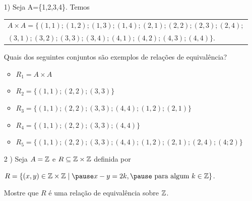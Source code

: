 \documentclass{beamer}
\begin{document}
    \begin{frame}
        \begin{exemplos}
            \begin{itemize}
                \item[1)] Seja A=\{1,2,3,4\}. \pause Temos
                \begin{center}
                    \begin{tabular}{l}
                        $A\times A = \{(1,1); (1,2);(1,3);(1,4);(2,1);(2,2);(2,3);(2,4);$\\
                        $(3,1);(3,2);(3,3);(3,4);(4,1);(4,2);(4,3);(4,4)\}.$
                    \end{tabular}
                \end{center}
                Quais dos seguintes conjuntos s\~ao exemplos de rela{\c c}{\~o}es de equival{\^e}ncia?
                \begin{itemize}
                    \item $R_{1}= A\times A$\pause \vspace{.3cm}
                    \item $R_{2}=\{(1,1);(2,2);(3,3)\}$\pause \vspace{.3cm}
                    \item $R_{3}=\{(1,1);(2,2);(3,3);(4,4);(1,2);(2,1)\}$\pause \vspace{.3cm}
                    \item $R_{4}=\{(1,1);(2,2);(3,3);(4,4)\}$\pause \vspace{.3cm}
                    \item $R_{5}=\{(1,1);(2,2);(3,3);(4,4);(1,2);(2,1);(2,4);(4;2)\}$\pause
                \end{itemize}
            \end{itemize}
        \end{exemplos}
    \end{frame}
    \begin{frame}
    \end{frame}
    \begin{frame}
        \begin{exemplos}
            \begin{itemize}[label={\arabic*})]                
                \item[2
                )] Seja $A = \mathbb{Z}$ \pause e $R\subseteq \mathbb{Z}\times \mathbb{Z}$ \pause definida por
                \begin{center}
                    $R = \{(x,y)\in \z \times \z \mid \pause x - y = 2k, \pause \mbox{ para algum } k \in \z\}$.\pause
                \end{center}
                 Mostre que $R$ \'e uma rela{\c c}{\~a}o de equival{\^e}ncia sobre $\mathbb{Z}$.\pause
            \end{itemize}
        \end{exemplos}
        \vspace{3cm}
    \end{frame}
\end{document}
